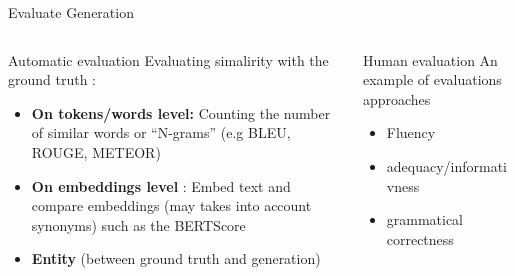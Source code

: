 \documentclass[10pt,aspectratio=169]{beamer}
\begin{document}
\begin{frame}{Evaluate Generation}
    \begin{columns}
        \begin{column}{0.6\textwidth}
            \begin{block}{Automatic evaluation}
                Evaluating simalirity with the ground truth :
                \begin{itemize}
                    \item \textbf{On tokens/words level: } Counting the number of similar words or ``N-grams'' (e.g BLEU, ROUGE, METEOR)
    
                    \item \textbf{On embeddings level} : Embed text and compare embeddings (may takes into account synonyms) such as the BERTScore\cite{}
                    \item \textbf{Entity} (between ground truth and generation)
                \end{itemize}
                
            \end{block}     
        \end{column}
        \begin{column}{0.4\textwidth}
            \begin{block}{Human evaluation}
                An example of evaluations approaches \cite{Thorleiksdttir2021UnderstandingHPb}
                \begin{itemize}
                    \item Fluency 
                    \item adequacy/informativness
                    \item grammatical correctness
                \end{itemize}
                
            \end{block}
            
        \end{column}
    \end{columns}

\end{frame}
\end{document}
